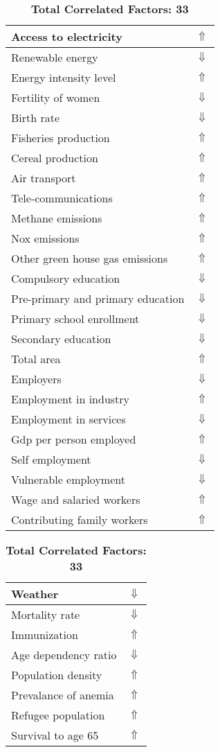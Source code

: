 \documentclass[12pt,notitlepage,oneside]{report}
\begin{document}
\begin{table}[!htb]
\caption{\textbf{Puts At High Risk: People with chronic disease $\Uparrow$}}
\centering
\label{Correlated Socio-economic Factors0}
\begin{tabular}{|l|l|}
\hline
Access to electricity & $\Uparrow$\\ \hline
Renewable energy & $\Downarrow$\\ \hline
Energy intensity level & $\Uparrow$\\ \hline
Fertility of women & $\Downarrow$\\ \hline
Birth rate & $\Downarrow$\\ \hline
Fisheries production & $\Uparrow$\\ \hline
Cereal production & $\Uparrow$\\ \hline
Air transport  & $\Uparrow$\\ \hline
Tele-communications & $\Uparrow$\\ \hline
Methane emissions & $\Uparrow$\\ \hline
Nox emissions & $\Uparrow$\\ \hline
Other green house gas emissions & $\Uparrow$\\ \hline
Compulsory education & $\Downarrow$\\ \hline
Pre-primary and primary education & $\Downarrow$\\ \hline
Primary school enrollment & $\Downarrow$\\ \hline
Secondary education & $\Downarrow$\\ \hline
Total area & $\Uparrow$\\ \hline
Employers & $\Downarrow$\\ \hline
Employment in industry & $\Uparrow$\\ \hline
Employment in services & $\Downarrow$\\ \hline
Gdp per person employed & $\Uparrow$\\ \hline
Self employment & $\Downarrow$\\ \hline
Vulnerable employment & $\Downarrow$\\ \hline
Wage and salaried workers & $\Uparrow$\\ \hline
Contributing family workers & $\Uparrow$\\ \hline
\end{tabular}
\begin{tabular}{|l|l|}
\hline
Weather & $\Downarrow$\\ \hline
Mortality rate & $\Downarrow$\\ \hline
Immunization & $\Uparrow$\\ \hline
Age dependency ratio & $\Downarrow$\\ \hline
Population density & $\Uparrow$\\ \hline
Prevalance of anemia & $\Uparrow$\\ \hline
Refugee population & $\Uparrow$\\ \hline
Survival to age 65 & $\Uparrow$\\ \hline
\end{tabular}
\caption*{\textbf{Total Correlated Factors: 33}}
\end{table}
\end{document}
